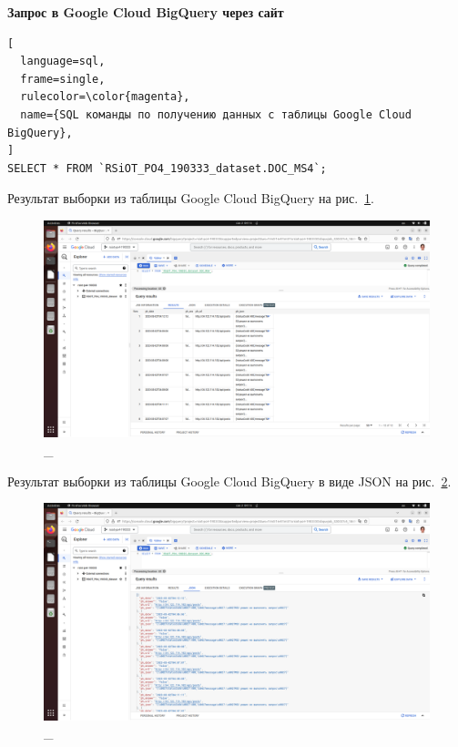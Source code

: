 \documentclass[12pt, a4paper, simple]{eskdtext}
\begin{document}
  \begin{center}
    \textbf{Запрос в Google Cloud BigQuery через сайт}
  \end{center}


\begin{lstlisting}[
  language=sql,
  frame=single,
  rulecolor=\color{magenta},
  name={SQL команды по получению данных с таблицы Google Cloud BigQuery},
]
SELECT * FROM `RSiOT_PO4_190333_dataset.DOC_MS4`;
\end{lstlisting}

  Результат выборки из таблицы Google Cloud BigQuery \cite{GoogleCloudBigQuery} на рис.~\ref{fig:40}.

  \begin{figure}[!h]
    \centering
    \includegraphics[width=16cm]
    {images/GoogleCloudBigQueryExplorer/2023-03-02_04-15-26.png}
    \caption{\_}
    \label{fig:40}
  \end{figure}

  \newpage
  Результат выборки из таблицы Google Cloud BigQuery \cite{GoogleCloudBigQuery} в виде JSON на рис.~\ref{fig:41}.

  \begin{figure}[!h]
    \centering
    \includegraphics[width=16cm]
    {images/GoogleCloudBigQueryExplorer/2023-03-02_04-15-46.png}
    \caption{\_}
    \label{fig:41}
  \end{figure}
\end{document}
